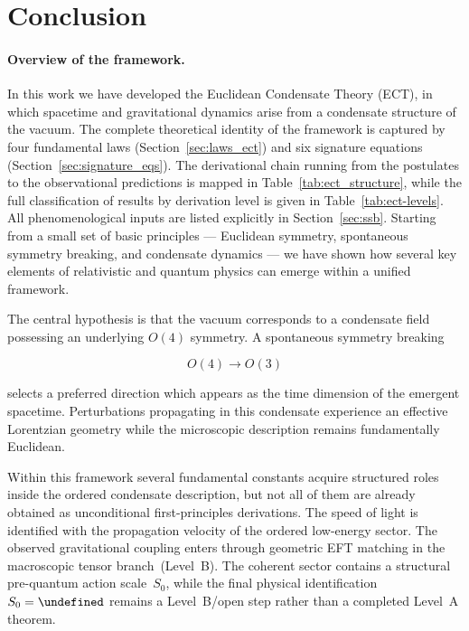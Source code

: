 \documentclass[11pt,a4paper]{article}
\let\hbar\undefined
\numberwithin{equation}{section}
\begin{document}
\FloatBarrier
\clearpage
\section{Conclusion}
\label{sec:conclusion}

\paragraph{Overview of the framework.}

In this work we have developed the Euclidean Condensate Theory (ECT), in
which spacetime and gravitational dynamics arise from a condensate
structure of the vacuum.
The complete theoretical identity of the framework is captured by four
fundamental laws (Section~\ref{sec:laws_ect}) and six signature
equations (Section~\ref{sec:signature_eqs}).
The derivational chain running from the postulates to the observational
predictions is mapped in Table~\ref{tab:ect_structure}, while the full
classification of results by derivation level is given in
Table~\ref{tab:ect-levels}.
All phenomenological inputs are listed explicitly in
Section~\ref{sec:ssb}. Starting from a small set of basic principles
— Euclidean symmetry, spontaneous symmetry breaking, and condensate
dynamics — we have shown how several key elements of relativistic and
quantum physics can emerge within a unified framework.

The central hypothesis is that the vacuum corresponds to a condensate
field possessing an underlying $O(4)$ symmetry. A spontaneous symmetry
breaking

\[
O(4)\rightarrow O(3)
\]

selects a preferred direction which appears as the time dimension of the
emergent spacetime. Perturbations propagating in this condensate
experience an effective Lorentzian geometry while the microscopic
description remains fundamentally Euclidean.

Within this framework several fundamental constants acquire structured
roles inside the ordered condensate description, but not all of them are
already obtained as unconditional first-principles derivations.
The speed of light is identified with the propagation velocity of the
ordered low-energy sector.
The observed gravitational coupling enters through geometric EFT matching
in the macroscopic tensor branch~(Level~B).
The coherent sector contains a structural pre-quantum action scale~$S_0$,
while the final physical identification $S_0=\hbar$ remains a
Level~B/open step rather than a completed Level~A theorem.
\end{document}
